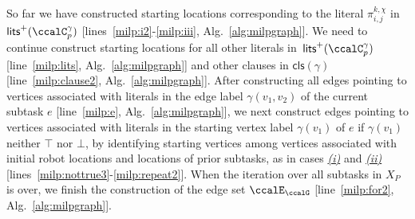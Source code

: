 \documentclass[Afour,sageh,times]{sagej}
\newcommand{\clause}[1]{\mathsf{cls}(#1)}
\newcommand{\vertex}[1]{v_{\textup{#1}}}
\renewcommand{\ap}[3]{\mathcal{\pi}_{{#1},{#2}}^{#3}}
\begin{document}
So far we have constructed starting locations corresponding to the literal $\ap{i}{j}{k,\chi}$ in $\mathsf{lits}^+(\ccalC_p^{\gamma})$ [lines~\ref{milp:i2}-\ref{milp:iii}, Alg.~\ref{alg:milpgraph}]. We need to continue construct starting locations for all other literals in~$\mathsf{lits}^+(\ccalC_p^{\gamma})$ [line~\ref{milp:lits},  Alg.~\ref{alg:milpgraph}] and other clauses in $\clause{\gamma}$ [line~\ref{milp:clause2},  Alg.~\ref{alg:milpgraph}].
After constructing all edges pointing to vertices associated with literals in the edge label $\gamma(v_1, v_2)$ of the current subtask $e$ [line~\ref{milp:e},  Alg.~\ref{alg:milpgraph}], we next construct  edges pointing to vertices associated with literals in the starting vertex label $\gamma(v_1)$ of $e$ if $\gamma(v_1)$ neither $\top$ nor $\bot$, by identifying starting vertices among vertices associated with initial robot locations and locations of prior subtasks, as in cases \hyperref[sec:a]{\it (i)} and \hyperref[sec:b]{\it (ii)} [lines~\ref{milp:nottrue3}-\ref{milp:repeat2}]. When the iteration over all subtasks in $X_{P}$ is over, we finish the construction of  the edge set $\ccalE_\ccalG$ [line~\ref{milp:for2},  Alg.~\ref{alg:milpgraph}].






\end{document}
